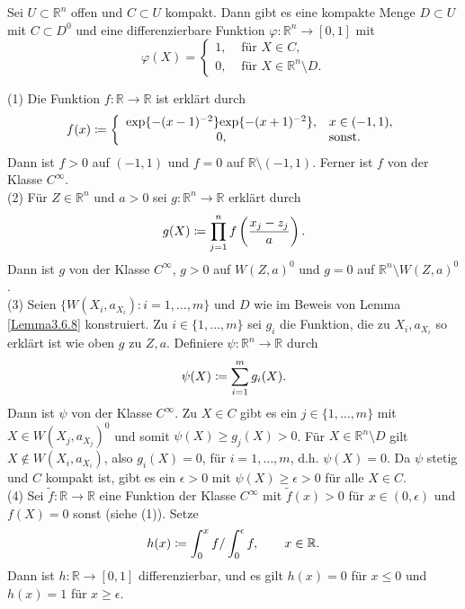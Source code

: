 \documentclass[a4paper,twoside,DIV15,BCOR12mm]{scrbook}
\begin{document}
\bigskip

\begin{lemma}\label{Lemma3.6.9} {Sei $U \subset {\mathbb R}^{n}$ 
offen und $C \subset U$ kompakt. Dann gibt es eine kompakte Menge $D 
\subset U$ mit $C \subset D^{0}$ und eine differenzierbare Funktion 
$\varphi: {\mathbb R}^{n} \to [0,1]$ mit
\[ \varphi(X) = \left\{ \begin{array}{ll}
1, & \mbox{ für } X \in C, \\ 0, & \mbox{ für } X \in {\mathbb 
R}^{n} \setminus D. \end{array} \right. \]}
\end{lemma}

\bigskip

 (1) Die Funktion $f: {\mathbb R} \to {\mathbb 
R}$ ist erklärt durch
\[ f(x) \da  \left\{ \begin{array}{cl}
{\rm exp}\{-(x-1)^{-2}\} {\rm exp}\{-(x+1)^{-2}\}, & x \in (-1,1), \\
0, & \mbox{sonst.} \end{array} \right. \]
Dann ist $f > 0$ auf $(-1,1)$ und $f = 0$ auf ${\mathbb R} 
\setminus (-1,1)$. Ferner ist $f$ von der Klasse $C^{\infty}$.\\

\noindent
(2) Für $Z \in {\mathbb R}^{n}$ und $a > 0$ sei $g: {\mathbb R}^{n} 
\to {\mathbb R}$ erklärt durch
\[ g(X) \da  \prod_{j=1}^{n} f\left(\frac{x_{j}-z_{j}}{a}\right). \]
Dann ist $g$ von der Klasse $C^{\infty}$, $g > 0$ auf $W(Z,a)^{0}$ 
und $g = 0$ auf ${\mathbb R}^{n} \setminus W(Z,a)^{0}$.\\

\noindent
(3) Seien $\{W(X_{i},a_{X_i}): i = 1,\dots,m\}$ und $D$ wie im Beweis 
von Lemma \ref{Lemma3.6.8} konstruiert. Zu $i \in \{1,\dots,m\}$ sei $g_{i}$ die 
Funktion, die zu $X_{i}, a_{X_i}$ so erklärt ist wie oben $g$ zu $Z, 
a$. Definiere $\psi: {\mathbb R}^{n} \to {\mathbb R}$ durch
\[ \psi(X) \da  \sum_{i=1}^{m} g_{i}(X). \]
Dann ist $\psi$ von der Klasse $C^{\infty}$. Zu $X \in C$ gibt es ein 
$j \in \{1,\dots,m\}$ mit $X \in W(X_{j},a_{X_j})^{0}$ und somit 
$\psi(X) \ge g_{j}(X) > 0$. Für $X \in {\mathbb R}^{n} \setminus D$ 
gilt $X \notin W(X_{i},a_{X_i})$, also $g_{i}(X) = 0$, für $i = 
1,\dots,m$, d.h. $\psi(X) = 0$. Da $\psi$ stetig und $C$ kompakt ist, 
gibt es ein $\epsilon > 0$ mit $\psi(X) \ge \epsilon > 0$ für alle 
$X \in C$.\\

\noindent
(4) Sei $\tilde{f} : {\mathbb R} \to {\mathbb R}$ eine Funktion der 
Klasse $C^{\infty}$ mit $\tilde{f}(x) > 0$ für $x \in (0,\epsilon)$ 
und $f(X) = 0$ sonst (siehe (1)). Setze
\[ h(x) \da  \int_{0}^{x} f / \int_{0}^{\epsilon} f, \qquad x \in 
{\mathbb R}. \]
Dann ist $h: {\mathbb R} \to [0,1]$ differenzierbar, und es gilt 
$h(x) = 0$ für $x \le 0$ und $h(x) = 1$ für $x \ge \epsilon$.\\ 
\end{document}
